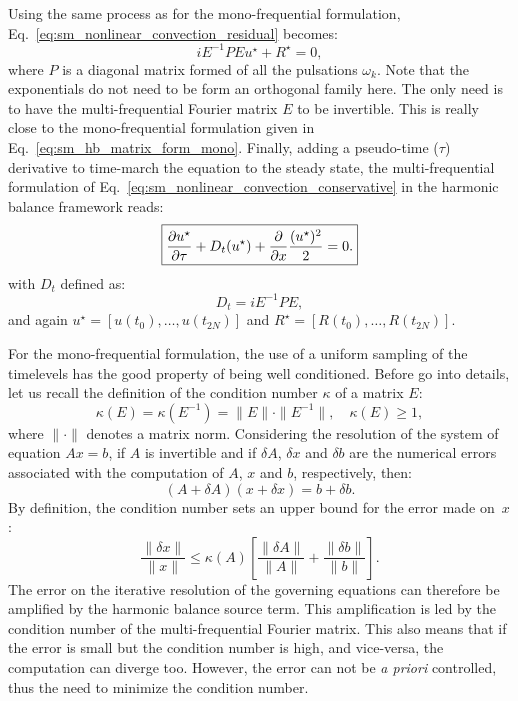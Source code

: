 Using the same process as for the mono-frequential formulation,
Eq.~\eqref{eq:sm_nonlinear_convection_residual} becomes:
\begin{equation}
	i E^{-1} P E u^\star + R^\star = 0,
\end{equation}
where $P$ is a diagonal matrix formed of all the pulsations $\omega_k$.
Note that the exponentials do not need to be form an
orthogonal family here. The only need is to have the multi-frequential
Fourier matrix $E$ to be invertible.
This is really close to the mono-frequential formulation given
in Eq.~\eqref{eq:sm_hb_matrix_form_mono}.
Finally, adding a pseudo-time ($\tau$) derivative 
to time-march the equation to the steady state,
the multi-frequential formulation of 
Eq.~\eqref{eq:sm_nonlinear_convection_conservative} in the harmonic
balance framework reads:
\begin{equation}
	\fbox{$
	\displaystyle \frac{\partial u^\star}{\partial \tau} +
	D_t (u^\star) + 
	\displaystyle \frac{\partial}{\partial x}
		\frac{(u^\star)^2}{2} = 0.
	$}
\end{equation}
with $D_t$ defined as:
\begin{equation}
	D_t = i E^{-1} P E,
	\label{eq:sm_multi_spectral_operator}
\end{equation}
and again $u^\star = [u(t_0), \ldots, u(t_{2N})]$ 
and $R^\star = [R(t_0), \ldots, R(t_{2N})]$.

For the mono-frequential formulation, the use of a uniform
sampling of the timelevels has the good property of being
well conditioned.
Before go into details, let us recall the definition of the
condition number $\kappa$ of a matrix $E$:
\begin{equation}
	\kappa (E) = \kappa (E^{-1}) = \| E \| \cdot \| E^{-1} \|, \quad
    \kappa(E) \geq 1,
\end{equation}
where $\| \cdot \|$ denotes a matrix norm.  Considering the resolution
of the system of equation
$A x = b$, if $A$ is invertible and if $\delta A$, $\delta x$ and
$\delta b$ are the numerical errors associated with the computation of
$A$, $x$ and $b$, respectively, then:
\begin{equation}
   (A + \delta A)(x + \delta x) = b + \delta b.
   \label{eq:error_reso}
\end{equation}
By definition, the condition number sets an upper bound for 
the error made on~$x$:
\begin{equation}
   \frac{\| \delta x \|}{\| x \|} \leq 
   \kappa(A)\left[\frac{\| \delta A \|}{\| A \|} + 
   \frac{\| \delta b \|}{\| b \|} \right].
   \label{eq:conditonnig_amp}
\end{equation}
The error on the iterative resolution of the governing equations can
therefore be amplified by the harmonic balance source term. 
This amplification is
led by the condition number of the multi-frequential Fourier matrix. This
also means that if the error is small but the condition number is
high, and vice-versa, the computation can diverge too. However, the
error can not be \emph{a priori} controlled, thus the need to
minimize the condition number.

